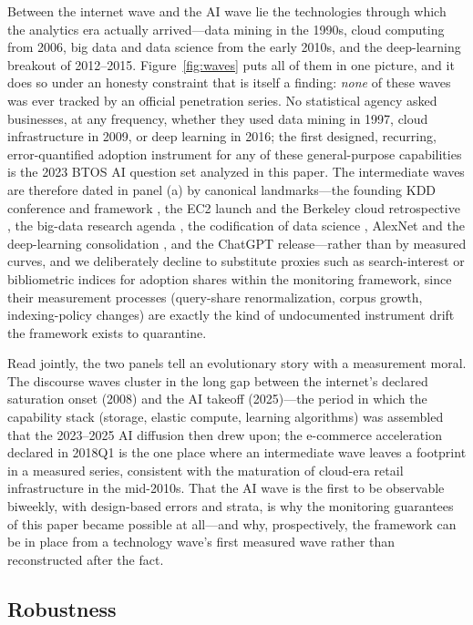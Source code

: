 \documentclass[review,authoryear,12pt]{elsarticle}
\begin{document}
Between the internet wave and the AI wave lie the technologies through which the analytics era actually arrived---data mining in the 1990s, cloud computing from 2006, big data and data science from the early 2010s, and the deep-learning breakout of 2012--2015. Figure~\ref{fig:waves} puts all of them in one picture, and it does so under an honesty constraint that is itself a finding: \emph{none} of these waves was ever tracked by an official penetration series. No statistical agency asked businesses, at any frequency, whether they used data mining in 1997, cloud infrastructure in 2009, or deep learning in 2016; the first designed, recurring, error-quantified adoption instrument for any of these general-purpose capabilities is the 2023 BTOS AI question set analyzed in this paper. The intermediate waves are therefore dated in panel (a) by canonical landmarks---the founding KDD conference and framework \citep{fayyad1996}, the EC2 launch and the Berkeley cloud retrospective \citep{armbrust2010}, the big-data research agenda \citep{chen2012}, the codification of data science \citep{provost2013}, AlexNet and the deep-learning consolidation \citep{krizhevsky2017,lecun2015}, and the ChatGPT release---rather than by measured curves, and we deliberately decline to substitute proxies such as search-interest or bibliometric indices for adoption shares within the monitoring framework, since their measurement processes (query-share renormalization, corpus growth, indexing-policy changes) are exactly the kind of undocumented instrument drift the framework exists to quarantine.

Read jointly, the two panels tell an evolutionary story with a measurement moral. The discourse waves cluster in the long gap between the internet's declared saturation onset (2008) and the AI takeoff (2025)---the period in which the capability stack (storage, elastic compute, learning algorithms) was assembled that the 2023--2025 AI diffusion then drew upon; the e-commerce acceleration declared in 2018Q1 is the one place where an intermediate wave leaves a footprint in a measured series, consistent with the maturation of cloud-era retail infrastructure in the mid-2010s. That the AI wave is the first to be observable biweekly, with design-based errors and strata, is why the monitoring guarantees of this paper became possible at all---and why, prospectively, the framework can be in place from a technology wave's first measured wave rather than reconstructed after the fact.

\subsection{Robustness}
\label{sec:robust}
\end{document}
